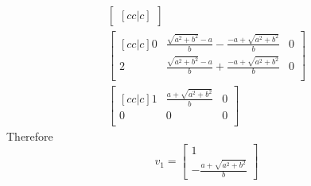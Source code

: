 \documentclass[12pt]{article}
\begin{document}
\begin{align}
\begin{bmatrix}[cc|c]
	\end{bmatrix} \\
	\begin{bmatrix}[cc|c]
	0                      & 
	\frac {\sqrt{a^{2} + b^{2}}-a} 
	{b} 
	- \frac {- a + \sqrt{a^{2} + b^{2}}}b 
	& 0 \\
	2                        & 
	\frac {\sqrt{a^{2} + b^{2}}-a} 
	{b}
	+ \frac {- a + \sqrt{a^{2} + b^{2}}}b 
	& 0 \\                                                                       
	\end{bmatrix} \\
	\begin{bmatrix}[cc|c]
	1                        & \frac  {a + \sqrt{a^{2} + b^{2}}}    b                                   & 0 \\
	0                        & 0                                                                        & 0 \\
	\end{bmatrix} 
\end{align}
Therefore
\begin{equation}
	v_1=\begin{bmatrix}
	1 \\
	- \frac  {a + \sqrt{a^{2} + b^{2}}} b
	\end{bmatrix}
\end{equation} 
\end{document}
